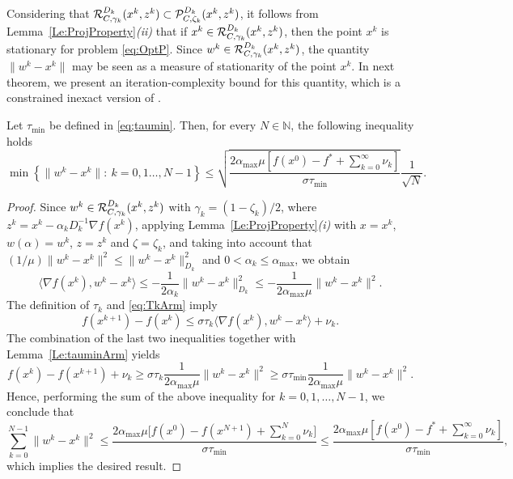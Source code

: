 Considering  that $ {\cal R}_{C,\gamma_k}^{D_k}(x^{k}, z^k) \subset {\cal P}_{C, \zeta_k}^{D_k}(x^{k}, z^k)$, it follows from Lemma~\ref{Le:ProjProperty}{\it (ii)}  that if $x^k \in {\cal R}_{C,\gamma_k}^{D_k}(x^{k}, z^k)$, then the point $x^k$ is stationary for problem \eqref{eq:OptP}. Since $w^k \in {\cal R}_{C,\gamma_k}^{D_k}(x^{k}, z^k)$, the quantity $\|w^k-x^k\|$ may be seen as a measure of stationarity of the point $x^k$. In next theorem, we present an iteration-complexity bound for this quantity,  which is a constrained inexact  version of  \cite[Theorem~1]{GrapigliaSachs2017}.

\begin{theorem} \label{eq:theocomp}
	Let $ \tau_{\min}$ be defined in \eqref{eq;taumin}. Then, for every $N \in \mathbb{N}$, the following inequality holds
	$$
		\min\left\{\|w^k-x^k\| :~ k= 0, 1 \ldots, N-1\right\} \leq \sqrt{\frac{2{\alpha_{\max}}\mu\left[ f(x^0)-f^* +\sum_{k= 0}^{\infty}\nu_k\right] }{\sigma \tau_{\min}}} \frac{1}{\sqrt{N}}.
	$$
\end{theorem}

\begin{proof}
	Since  $w^k \in   {\cal R}_{C,\gamma_k}^{D_k}(x^{k}, z^k)$ with    $\gamma_k=(1-\zeta_k)/2$, where $z^k = x^{k}-\alpha_k D^{-1} _k\nabla f(x^{k})$,  applying  Lemma~\ref{Le:ProjProperty}{\it (i)} with $x=x^k$, $w(\alpha) = w^k$, $z = z^k$ and $\zeta= \zeta_k$, and taking into account that $(1/\mu)  \|w^k-x^k\|^2 \leq  \|w^k-x^k\|_{D_k}^2$  and $0<\alpha_k \leq \alpha_{\max}$, we obtain
	\begin{equation*}\label{eq:fD2}
		\big\langle \nabla f(x^{k}), w^k-x^{k}\big\rangle \leq -\frac{1}{2\alpha_k} \|w^k-x^k\|_{D_k}^2\leq -\frac{1}{2\alpha_{\max}\mu} \|w^k-x^k\|^2.
	\end{equation*}
	The definition of $\tau_k$  and \eqref{eq:TkArm} imply
	$$f(x^{k+1}) - f(x^k) \leq \sigma\tau_k \big\langle \nabla f(x^{k}),  w^k-x^{k} \big\rangle+\nu_k.$$
	The combination of the last two inequalities together with Lemma~\ref{Le:tauminArm} yields
	$$
		f(x^k) - f(x^{k+1})+\nu_k \geq \sigma\tau_k \frac{1}{2\alpha_{\max}\mu} \|w^k-x^k\|^2 \geq \sigma \tau_{\min} \frac{1}{2\alpha_{\max}\mu} \|w^k-x^k\|^2.
	$$
	Hence, performing the sum of the above inequality for $k= 0, 1,\ldots, N-1$, we conclude that
	$$
		\sum_{k= 0}^{N-1} \|w^k - x^k\|^2 \leq \frac{2{\alpha_{\max}}\mu \big[f(x^0) - f(x^{N+1})+ \sum_{k= 0}^{N}\nu_k\big]}{\sigma \tau_{\min}}\leq \frac{2{\alpha_{\max}}\mu \left[ f(x^0) - f^*+ \sum_{k= 0}^{\infty}\nu_k\right]}{\sigma \tau_{\min}},
	$$
	which implies the desired result.
\end{proof}

